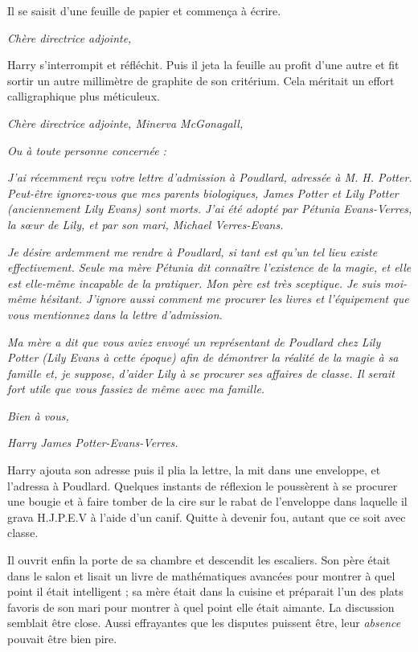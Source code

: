 Il se saisit d'une feuille de papier et commença à écrire.

\emph{Chère directrice adjointe,} 

Harry s'interrompit et réfléchit. Puis il jeta la feuille au profit d'une autre et fit sortir un autre millimètre de graphite de son critérium. Cela méritait un effort calligraphique plus méticuleux.

\emph{Chère directrice adjointe, Minerva McGonagall,} 

\emph{Ou à toute personne concernée :} 

\emph{J'ai récemment reçu votre lettre d'admission à Poudlard, adressée à M. H. Potter. Peut-être ignorez-vous que mes parents biologiques, James Potter et Lily Potter (anciennement Lily Evans) sont morts. J'ai été adopté par Pétunia Evans-Verres, la sœur de Lily, et par son mari, Michael Verres-Evans.} 

\emph{Je désire ardemment me rendre à Poudlard, si tant est qu'un tel lieu existe effectivement. Seule ma mère Pétunia dit connaître l'existence de la magie, et elle est elle-même incapable de la pratiquer. Mon père est très sceptique. Je suis moi-même hésitant. J'ignore aussi comment me procurer les livres et l'équipement que vous mentionnez dans la lettre d'admission.} 

\emph{Ma mère a dit que vous aviez envoyé un représentant de Poudlard chez Lily Potter (Lily Evans à cette époque) afin de démontrer la réalité de la magie à sa famille et, je suppose, d'aider Lily à se procurer ses affaires de classe. Il serait fort utile que vous fassiez de même avec ma famille.} 

\emph{Bien à vous,} 

\emph{Harry James Potter-Evans-Verres.} 

Harry ajouta son adresse puis il plia la lettre, la mit dans une enveloppe, et l'adressa à Poudlard. Quelques instants de réflexion le poussèrent à se procurer une bougie et à faire tomber de la cire sur le rabat de l'enveloppe dans laquelle il grava H.J.P.E.V à l'aide d'un canif. Quitte à devenir fou, autant que ce soit avec classe.

Il ouvrit enfin la porte de sa chambre et descendit les escaliers. Son père était dans le salon et lisait un livre de mathématiques avancées pour montrer à quel point il était intelligent ; sa mère était dans la cuisine et préparait l'un des plats favoris de son mari pour montrer à quel point elle était aimante. La discussion semblait être close. Aussi effrayantes que les disputes puissent être, leur \emph{absence}  pouvait être bien pire.

